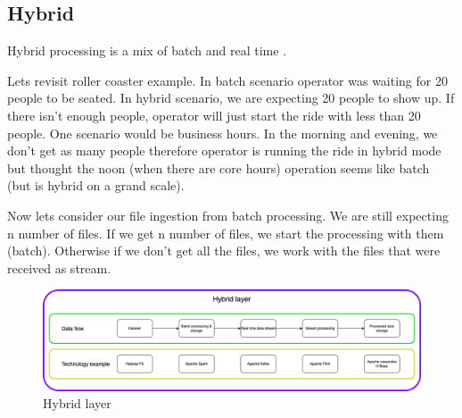 \subsection{Hybrid}\label{Hybrid}

Hybrid processing is a mix of batch and real time \parencite{lewis2013content}.

Lets revisit roller coaster example. In batch scenario operator was waiting for 20 people to be seated. In hybrid scenario, we are expecting 20 people to show up. If there isn't enough people, operator will just start the ride with less than 20 people. One scenario would be business hours. In the morning and evening, we don't get as many people therefore operator is running the ride in hybrid mode but thought the noon (when there are core hours) operation seems like batch (but is hybrid on a grand scale).

Now lets consider our file ingestion from batch processing. We are still expecting n number of files. If we get n number of files, we start the processing with them (batch). Otherwise if we don't get all the files, we work with the files that were received as stream.

\begin{figure}[H]
\includegraphics[scale=0.30]{img/ProcessingParadigms/BigData-HybridLayer.png}
\centering
\caption{Hybrid layer}
\label{fig:HybridLayer}
\end{figure}